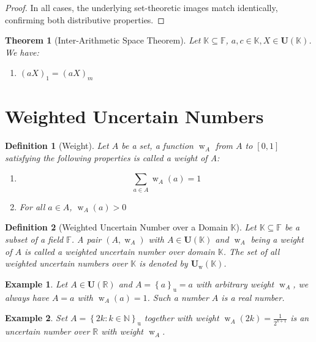 \documentclass[a4paper,12pt,twoside]{memoir}
\newtheorem{definition}{Definition}[chapter]
\newtheorem{theorem}{Theorem}[chapter]
\newtheorem{example}{Example}[chapter]
\DeclareMathOperator{\w}{w}
\newcommand{\set}[1]{\left\{#1\right\}} %
\newcommand{\s}[1]{\set{#1}_\mathrm{u}} %
\newcommand{\tsbd}[1]{\mathbf{U}(\mathbb{#1})}
\newcommand{\tsbdts}[1]{\mathbf{U}_{\w}(\mathbb{#1})} %
\newcommand{\ts}[1]{\w_{#1}} %
\newcommand{\kgdd}[1]{\left(#1\right)_1} %
\newcommand{\kgdt}[1]{\left(#1\right)_m} %
\begin{document}
\begin{proof}
		In all cases, the underlying set-theoretic images match identically, confirming both distributive properties.
	\end{proof}
	\begin{theorem}[Inter-Arithmetic Space Theorem]
		Let $\mathbb{K} \subseteq \mathbb{F}$, $a,c \in \mathbb{K}, X \in \tsbd{K}$. We have:
		\begin{enumerate}[leftmargin=*]
			\item $\kgdd{aX} = \kgdt{aX}$
		\end{enumerate}
	\end{theorem}
	
	\section{Weighted Uncertain Numbers}
	
	\begin{definition}[Weight]
		Let $A$ be a set, a function $\ts{A}$ from $A$ to $[0,1]$ satisfying the following properties is called a weight of A:
		\begin{enumerate}[leftmargin=*]
			\item $$\sum_{a \in A}{\ts{A}(a) } = 1$$
			\item For all $a \in A$, $\ts{A}(a) > 0 $
		\end{enumerate}
	\end{definition}
	
	\begin{definition}[Weighted Uncertain Number over a Domain $\mathbb{K}$]
		Let $\mathbb{K} \subseteq \mathbb{F}$ be a subset of a field $\mathbb{F}$. A pair $(A,\ts{A})$ with $A \in \tsbd{K}$ and $\ts{A}$ being a weight of $A$ is called a weighted uncertain number over domain $\mathbb{K}$. The set of all weighted uncertain numbers over $\mathbb{K}$ is denoted by $\tsbdts{K}$.
	\end{definition}
	
	\begin{example}
		Let $A \in \tsbd{R}$ and $A = \s{a} = a $ with arbitrary weight $\ts{A}$, we always have $A = a$ with $\ts{A}(a) =1$. Such a number $A$ is a real number.
	\end{example}
	
	\begin{example}
		Set $A=\s{2k : k \in \mathbb{N}}$ together with weight $\ts{A}(2k) = \frac{1}{2^{k+1}}$ is an uncertain number over $\mathbb{R}$ with weight $\ts{A}$.
	\end{example}
	
\end{document}
